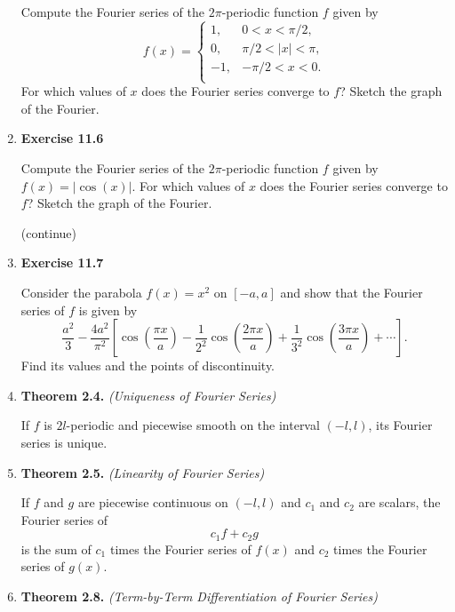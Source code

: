 \begin{enumerate}
Compute the Fourier series of the $2\pi$-periodic function $f$ given by
\[
f(x)=
\begin{cases}
1, & 0<x<\pi/2, \\
0, & \pi/2<|x|< \pi, \\
-1, & -\pi/2<x<0.\\
\end{cases}
\]
For which values of $x$ does the Fourier series converge to $f$? Sketch the graph of the Fourier.





\newpage

\item \textbf{Exercise 11.6} 

Compute the Fourier series of the $2\pi$-periodic function $f$ given by $f(x)=|\cos(x)|$. For which values of $x$ does the Fourier series converge to $f$? Sketch the graph of the Fourier.


\newpage 

(continue)


\newpage 


\item \textbf{Exercise 11.7} 

Consider the parabola $f(x)=x^{2}$ on $[-a,a]$ and show that the Fourier series of $f$ is given by 
\[\frac{a^{2}}{3} - \frac{4a^{2}}{\pi^{2}} \left[ \cos\left( \frac{\pi x}{a} \right) - \frac{1}{2^{2}}\cos\left( \frac{2 \pi x}{a} \right) + \frac{1}{3^{2}}\cos\left( \frac{3 \pi x}{a} \right) +\cdots \right]. \]
Find its values and the points of discontinuity.



\newpage



\item \textbf{Theorem 2.4.} \textit{(Uniqueness of Fourier Series)} 

If $f$ is $2 l$-periodic and piecewise smooth on the interval $(-l,l)$, its Fourier series is unique.



\item \textbf{Theorem 2.5.} \textit{(Linearity of Fourier Series)}

If $f$ and $g$ are piecewise continuous on $(-l,l)$ and $c _{1}$ and $c _{2}$ are scalars, the Fourier series of
\[c_{1}f+c_{2}g\]
is the sum of $c _{1}$ times the Fourier series of $f (x)$ and $c _{2}$ times the Fourier series of $g(x)$.



\item \textbf{Theorem 2.8.} \textit{(Term-by-Term Differentiation of Fourier Series)}


\end{enumerate}
